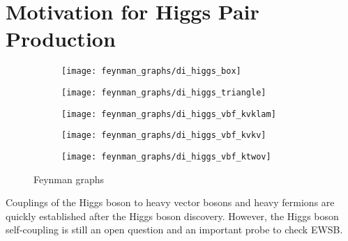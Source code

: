 \section{Motivation for Higgs Pair Production}%
\label{sec:hh_motivation}

\begin{figure}[htbp]
  \centering


  \begin{subfigure}{0.49\textwidth}
    \centering
    \texttt{[image: feynman\_graphs/di\_higgs\_box]}
    \subcaption{}
  \end{subfigure}\hfill%
  \begin{subfigure}{0.49\textwidth}
    \centering
    \texttt{[image: feynman\_graphs/di\_higgs\_triangle]}
    \subcaption{}
  \end{subfigure}

  \vspace*{1em}

  \begin{subfigure}{0.33\textwidth}
    \centering
    \texttt{[image: feynman\_graphs/di\_higgs\_vbf\_kvklam]}
    \subcaption{}
  \end{subfigure}\hfill%
  \begin{subfigure}{0.33\textwidth}
    \centering
    \texttt{[image: feynman\_graphs/di\_higgs\_vbf\_kvkv]}
    \subcaption{}
  \end{subfigure}\hfill%
  \begin{subfigure}{0.33\textwidth}
    \centering
    \texttt{[image: feynman\_graphs/di\_higgs\_vbf\_ktwov]}
    \subcaption{}
  \end{subfigure}

  \caption{Feynman graphs}
  \label{fig:hh_feynmans}
\end{figure}


Couplings of the Higgs boson to heavy vector bosons and heavy fermions
are quickly established after the Higgs boson discovery. However, the
Higgs boson self-coupling is still an open question and an important
probe to check EWSB.



